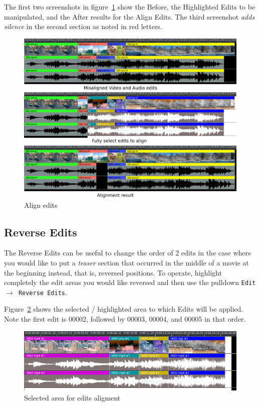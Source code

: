 The first two screenshots in figure~\ref{fig:align} show the Before, the Highlighted Edits to be manipulated, and the After results for the Align Edits. The third screenshot \textit{adds silence} in the second section as noted in red letters.
\begin{figure}[htpb]
    \centering
    \includegraphics[width=0.8\linewidth]{images/align.png}
    \caption{Align edits}
    \label{fig:align}
\end{figure}

\subsection{Reverse Edits}%
\label{sub:reverse_edits}

The Reverse Edits can be useful to change the order of 2 edits in the case where you would like to put a \textit{teaser} section that occurred in the middle of a movie at the beginning instead, that is, reversed positions.  To operate, highlight completely the edit areas you would like reversed and then use the pulldown \texttt{Edit $\rightarrow$ Reverse Edits}.

Figure~\ref{fig:reverse01} shows the selected / highlighted area to which Edits will be applied.  Note the first edit is 00002, followed by 00003, 00004, and 00005 in that order.
\begin{figure}[htpb]
    \centering
    \includegraphics[width=0.8\linewidth]{images/reverse01.png}
    \caption{Selected area for edits aligment}
    \label{fig:reverse01}
\end{figure}

